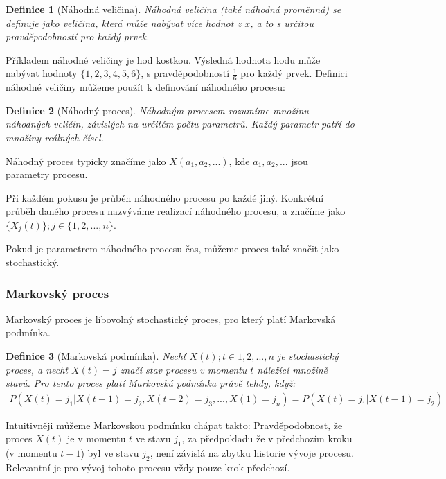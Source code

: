\documentclass{article}
\newtheorem{definition}{Definice}[subsection]
\begin{document}
  \begin{definition}[Náhodná veličina]
    Náhodná veličina (také náhodná proměnná) se definuje jako veličina, která může nabývat více hodnot z ${x}$, a to s určitou pravděpodobností pro každý prvek. \cite{lukas2009}  
  \end{definition}

  Příkladem náhodné veličiny je hod kostkou. Výsledná hodnota hodu může nabývat hodnoty ${\{1, 2, 3, 4, 5, 6\}}$, s pravděpodobností ${\frac{1}{6}}$ pro každý prvek.
  Definici náhodné veličiny můžeme použít k definování náhodného procesu:

  \begin{definition}[Náhodný proces]
    Náhodným procesem rozumíme množinu náhodných veličin, závislých na určitém počtu parametrů. Každý parametr patří do množiny reálných čísel. \cite{korenar2010}  
  \end{definition}

  Náhodný proces typicky značíme jako $X(a_1, a_2, ...)$, kde $a_1, a_2, ...$ jsou parametry procesu. 

  Při každém pokusu je průběh náhodného procesu po každé jiný. Konkrétní průběh daného procesu nazvýváme realizací náhodného procesu, a značíme jako ${\{X_j(t)\}; j \in \{1, 2, ..., n\}}$. \cite{korenar2010}

  Pokud je parametrem náhodného procesu čas, můžeme proces také značit jako stochastický. \cite{korenar2010}

  \subsubsection{Markovský proces}

  Markovský proces je libovolný stochastický proces, pro který platí Markovská podmínka.

  \begin{definition}[Markovská podmínka]
    Nechť $X(t); t \in {1,2, ..., n}$ je stochastický proces, a nechť $X(t) = j$ značí stav procesu v momentu $t$ náležící množině stavů. Pro tento proces platí Markovská podmínka právě tehdy, když:
    \begin{multline*}
      P(X(t) = j_1 | X(t-1) = j_2, X(t-2) = j_3, ... , X(1) = j_n)
      = P(X(t) = j_1 | X(t-1) = j_2)
    \end{multline*}
    \cite{lukas2009} \cite{korenar2010}
  \end{definition}

  Intuitivněji můžeme Markovskou podmínku chápat takto: Pravděpodobnost, že proces $X(t)$ je v momentu $t$ ve stavu $j_1$, za předpokladu že v předchozím kroku (v momentu $t-1$) byl ve stavu $j_2$, není závislá na zbytku historie vývoje procesu. Relevantní je pro vývoj tohoto procesu vždy pouze krok předchozí.
\end{document}
